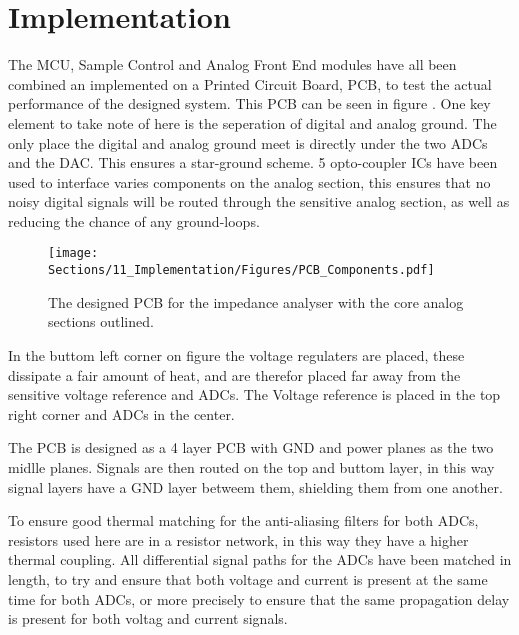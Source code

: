 \chapter{Implementation}\label{subsec:PCBDesign}
The MCU, Sample Control and Analog Front End modules have all been combined an implemented on a Printed Circuit Board, PCB, to test the actual performance of the designed system. This PCB can be seen in figure . One key element to take note of here is the seperation of digital and analog ground. The only place the digital and analog ground meet is directly under the two ADCs and the DAC. This ensures a star-ground scheme. 5 opto-coupler ICs have been used to interface varies components on the analog section, this ensures that no noisy digital signals will be routed through the sensitive analog section, as well as reducing the chance of any ground-loops. 

\begin{figure}[H]
   \centering
   \texttt{[image: Sections/11\_Implementation/Figures/PCB\_Components.pdf]}
   \caption{The designed PCB for the impedance analyser with the core analog sections outlined.}
   \label{fig_PCB}
\end{figure}

In the buttom left corner on figure  the voltage regulaters are placed, these dissipate a fair amount of heat, and are therefor placed far away from the sensitive voltage reference and ADCs. The Voltage reference is placed in the top right corner and ADCs in the center. 

The PCB is designed as a 4 layer PCB with GND and power planes as the two midlle planes. Signals are then routed on the top and buttom layer, in this way signal layers have a GND layer betweem them, shielding them from one another.

To ensure good thermal matching for the anti-aliasing filters for both ADCs, resistors used here are in a resistor network, in this way they have a higher thermal coupling. All differential signal paths for the ADCs have been matched in length, to try and ensure that both voltage and current is present at the same time for both ADCs, or more precisely to ensure that the same propagation delay is present for both voltag and current signals.